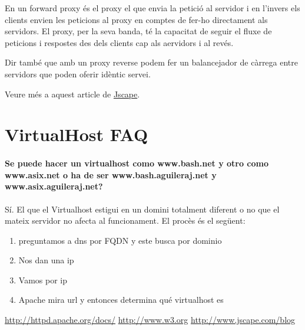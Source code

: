 \documentclass[a4paper, 11pt]{article}
\begin{document}
En un forward proxy \'es el proxy el que envia la petició al servidor i en l'invers els clients envien les peticions al proxy en comptes de fer-ho directament als servidors. El proxy, per la seva banda, t\'e la capacitat de seguir el fluxe de peticions i respostes des dels clients cap als aervidors i al rev\'es.

Dir tamb\'e que amb un proxy reverse podem fer un balancejador de càrrega entre servidors que poden oferir idèntic servei.

Veure m\'es a aquest article de \href{http://www.jscape.com/blog/bid/87783/Forward-Proxy-vs-Reverse-Proxy}{Jscape}\cite{Jscape}.

\section{VirtualHost FAQ}
\paragraph{Se puede hacer un virtualhost como www.bash.net y otro como www.asix.net o ha de ser www.bash.aguileraj.net y www.asix.aguileraj.net?}
Sí. El que el Virtualhost estigui en un domini totalment diferent o no que el mateix servidor no afecta al funcionament. El procès \'es el següent:
\begin{enumerate}
	\item preguntamos a dns por FQDN y este busca por dominio
	\item Nos dan una ip
  \item Vamos por ip
	\item Apache mira url y entonces determina qu\'e  virtualhost es
\end{enumerate}

\begin{thebibliography}{99}
	 \url{http://httpd.apache.org/docs/}
	 \url{http://www.w3.org}
	 \url{http://www.jscape.com/blog}
\end{thebibliography}
\end{document}

